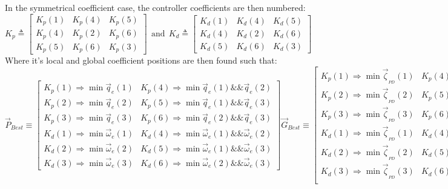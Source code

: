 In the symmetrical coefficient case, the controller coefficients are then numbered:
\begin{equation}\label{eq:simulation-attitde-pd-symmetric-coefficients}
K_p\triangleq \begin{bmatrix}
K_p(1) & K_p(4) & K_p(5)\\
K_p(4) & K_p(2) & K_p(6)\\
K_p(5) & K_p(6) & K_p(3)
\end{bmatrix}
~~\text{and}~~K_d\triangleq \begin{bmatrix}
K_d(1) & K_d(4) & K_d(5)\\
K_d(4) & K_d(2) & K_d(6)\\
K_d(5) & K_d(6) & K_d(3)
\end{bmatrix}
\end{equation}
Where it's local and global coefficient positions are then found such that:
\begin{subequations}\label{eq:simulation-attitude-pd-symmetric-best}
\begin{equation}
\vec{P}_{Best}\equiv
\begin{bmatrix}
K_p(1)\Rightarrow \min \vec{q}_e(1) & K_p(4)\Rightarrow \min \vec{q}_e(1)\&\&\vec{q}_e(2)\\
K_p(2)\Rightarrow \min \vec{q}_e(2)& K_p(5)\Rightarrow \min\vec{q}_e(1)\&\&\vec{q}_e(3) \\
K_p(3)\Rightarrow \min \vec{q}_e(3) & K_p(6)\Rightarrow \min\vec{q}_e(2)\&\&\vec{q}_e(3)\\
K_d(1)\Rightarrow \min \vec{\omega}_e(1) & K_d(4)\Rightarrow \min\vec{\omega}_e(1)\&\&\vec{\omega}_e(2)\\
K_d(2)\Rightarrow \min \vec{\omega}_e(2) & K_d(5)\Rightarrow\min\vec{\omega}_e(1)\&\&\vec{\omega}_e(3)\\
K_d(3)\Rightarrow \min \vec{\omega}_e(3)& K_d(6)\Rightarrow\min\vec{\omega}_e(2)\&\&\vec{\omega}_e(3)
\end{bmatrix}
\end{equation}
\begin{equation}
\vec{G}_{Best}\equiv\begin{bmatrix}
K_p(1)\Rightarrow \min \vec{\zeta}_{_{PD}}(1) & K_p(4)\Rightarrow\min\vec{\zeta}_{_{PD}}(1)\&\& \vec{\zeta}_{_{PD}}(2)\\
K_p(2)\Rightarrow \min \vec{\zeta}_{_{PD}}(2) & K_p(5)\Rightarrow\min\vec{\zeta}_{_{PD}}(1)\&\& \vec{\zeta}_{_{PD}}(3)\\
K_p(3)\Rightarrow \min \vec{\zeta}_{_{PD}}(3) & K_p(6)\Rightarrow\min\vec{\zeta}_{_{PD}}(2)\&\& \vec{\zeta}_{_{PD}}(3)\\
K_d(1)\Rightarrow \min \vec{\zeta}_{_{PD}}(1) & K_d(4)\Rightarrow\min\vec{\zeta}_{_{PD}}(1)\&\& \vec{\zeta}_{_{PD}}(2)\\
K_d(2)\Rightarrow \min \vec{\zeta}_{_{PD}}(2) & K_d(5)\Rightarrow\min\vec{\zeta}_{_{PD}}(1)\&\& \vec{\zeta}_{_{PD}}(3)\\
K_d(3)\Rightarrow \min \vec{\zeta}_{_{PD}}(3) & K_d(6)\Rightarrow\min\vec{\zeta}_{_{PD}}(2)\&\& \vec{\zeta}_{_{PD}}(3)\\
\end{bmatrix}
\end{equation}
\end{subequations}
